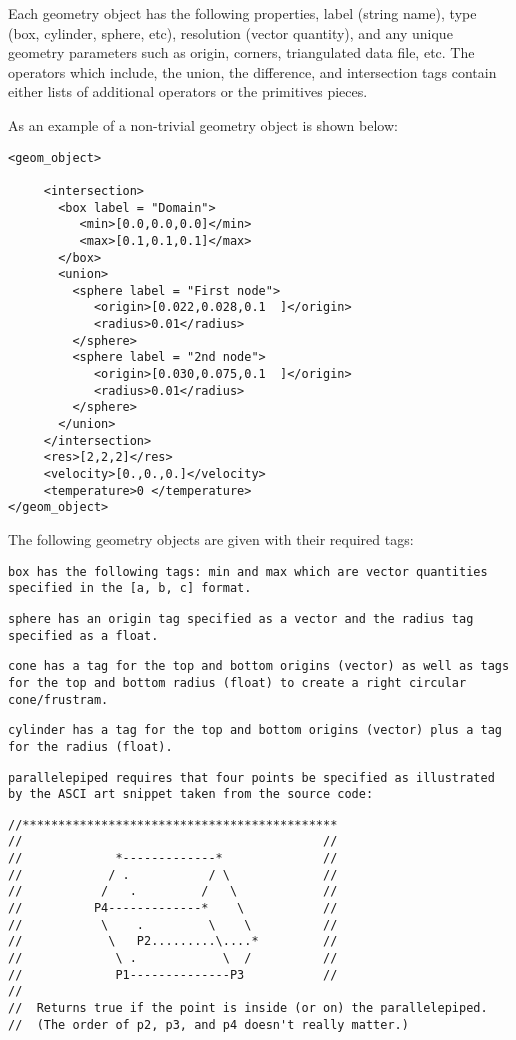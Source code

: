 Each geometry object has the following properties, label (string
name), type (box, cylinder, sphere, etc), resolution (vector
quantity), and any unique geometry parameters such as origin, corners,
triangulated data file, etc.  The operators which include, the union,
the difference, and intersection tags contain either lists of
additional operators or the primitives pieces.

As an example of a non-trivial geometry object is shown below:

\begin{Verbatim}[fontsize=\footnotesize]
<geom_object>

     <intersection>
       <box label = "Domain">
          <min>[0.0,0.0,0.0]</min>
          <max>[0.1,0.1,0.1]</max>
       </box>
       <union>
         <sphere label = "First node">
            <origin>[0.022,0.028,0.1  ]</origin>
            <radius>0.01</radius>
         </sphere>
         <sphere label = "2nd node">
            <origin>[0.030,0.075,0.1  ]</origin>
            <radius>0.01</radius>
         </sphere>
       </union>
     </intersection>
     <res>[2,2,2]</res>
     <velocity>[0.,0.,0.]</velocity>
     <temperature>0 </temperature>
</geom_object>
\end{Verbatim}

The following geometry objects are given with their required tags:

\tt box \normalfont has the following tags: min and max which are
vector quantities specified in the \tt [a, b, c] \normalfont format.

\tt sphere \normalfont has an origin tag specified as a vector and the
radius tag specified as a float.

\tt cone \normalfont has a tag for the top and bottom origins (vector)
as well as tags for the top and bottom radius (float) to create a
right circular cone/frustram.

\tt cylinder \normalfont has a tag for the top and bottom origins
(vector) plus a tag for the radius (float).

\tt parallelepiped \normalfont requires that four points be specified as
illustrated by the ASCI art snippet taken from the source code:

\begin{Verbatim}[fontsize=\footnotesize]
//********************************************
//                                          //
//             *-------------*              //
//            / .           / \             //
//           /   .         /   \            //
//          P4-------------*    \           //
//           \    .         \    \          //
//            \   P2.........\....*         //
//             \ .            \  /          //
//             P1--------------P3           //
//
//  Returns true if the point is inside (or on) the parallelepiped.
//  (The order of p2, p3, and p4 doesn't really matter.)
\end{Verbatim}

